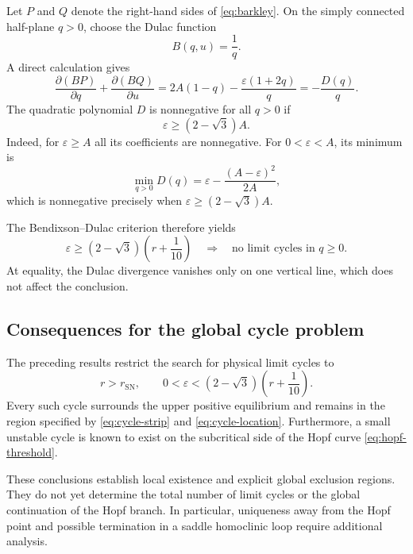\documentclass[11pt,reqno]{amsart}
\theoremstyle{plain}
\theoremstyle{definition}
\theoremstyle{remark}
\begin{document}
Let $P$ and $Q$ denote the right-hand sides of
\eqref{eq:barkley}. On the simply connected half-plane
$q>0$, choose the Dulac function
\[
B(q,u)=\frac1q.
\]
A direct calculation gives
\begin{equation}
\frac{\partial(BP)}{\partial q}
+
\frac{\partial(BQ)}{\partial u}
=
2A(1-q)-\frac{\varepsilon(1+2q)}q
=
-\frac{D(q)}q.
\label{eq:dulac-divergence}
\end{equation}
The quadratic polynomial $D$ is nonnegative for all $q>0$
if
\begin{equation}
\varepsilon\geq(2-\sqrt3)A.
\label{eq:dulac-condition}
\end{equation}
Indeed, for $\varepsilon\geq A$ all its coefficients are
nonnegative. For $0<\varepsilon<A$, its minimum is
\[
\min_{q>0}D(q)
=
\varepsilon-\frac{(A-\varepsilon)^2}{2A},
\]
which is nonnegative precisely when
$\varepsilon\geq(2-\sqrt3)A$.

The Bendixson--Dulac criterion therefore yields
\begin{equation}
\boxed{
\varepsilon\geq
(2-\sqrt3)\left(r+\frac1{10}\right)
\quad\Longrightarrow\quad
\text{no limit cycles in }q\geq0.
}
\label{eq:no-cycles-large-epsilon}
\end{equation}
At equality, the Dulac divergence vanishes only on one
vertical line, which does not affect the conclusion.


\subsection{Consequences for the global cycle problem}
\label{subsec:global-cycle-problem}

The preceding results restrict the search for physical
limit cycles to
\[
r>r_{\mathrm{SN}},
\qquad
0<\varepsilon<
(2-\sqrt3)\left(r+\frac1{10}\right).
\]
Every such cycle surrounds the upper positive equilibrium
and remains in the region specified by
\eqref{eq:cycle-strip} and \eqref{eq:cycle-location}.
Furthermore, a small unstable cycle is known to exist on
the subcritical side of the Hopf curve
\eqref{eq:hopf-threshold}.

These conclusions establish local existence and explicit
global exclusion regions. They do not yet determine the
total number of limit cycles or the global continuation
of the Hopf branch. In particular, uniqueness away from
the Hopf point and possible termination in a saddle
homoclinic loop require additional analysis.










\end{document}
